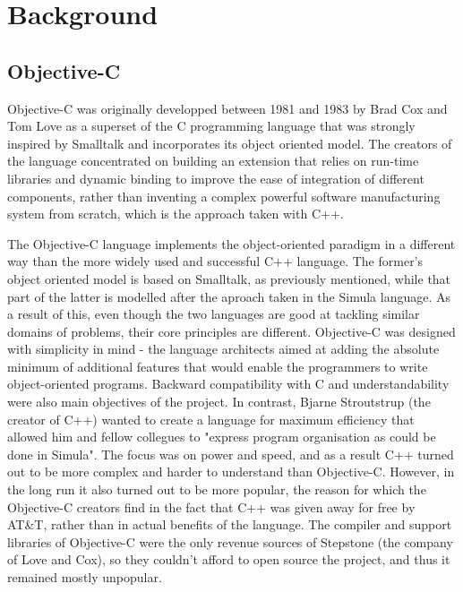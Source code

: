 \documentclass[parskip]{cs4rep}
\begin{document}
\chapter{Background}

\section{Objective-C}

Objective-C was originally developped between 1981 and 1983 by Brad Cox and Tom Love as a superset of the C programming language that was strongly inspired by Smalltalk and incorporates its object oriented model\cite{Biancuzzi2009}. The creators of the language concentrated on building an extension that relies on run-time libraries and dynamic binding to improve the ease of integration of different components, rather than inventing a complex powerful software manufacturing system from scratch, which is the approach taken with C++.

The Objective-C language implements the object-oriented paradigm in a different way than the more widely used and successful C++ language. The former's object oriented model is based on Smalltalk, as previously mentioned, while that part of the latter is modelled after the aproach taken in the Simula language. As a result of this, even though the two languages are good at tackling similar domains of problems, their core principles are different. Objective-C was designed with simplicity in mind - the language architects aimed at adding the absolute minimum of additional features that would enable the programmers to write object-oriented programs. Backward compatibility with C and understandability were also main objectives of the project. In contrast, Bjarne Stroutstrup (the creator of C++) wanted to create a language for maximum efficiency that allowed him and fellow collegues to "express program organisation as could be done in Simula"\cite{Biancuzzi2009}. The focus was on power and speed, and as a result C++ turned out to be more complex and harder to understand than Objective-C. However, in the long run it also turned out to be more popular, the reason for which the Objective-C creators find in the fact that C++ was given away for free by AT\&T, rather than in actual benefits of the language. The compiler and support libraries of Objective-C were the only revenue sources of Stepstone (the company of Love and Cox), so they couldn't afford to open source the project, and thus it remained mostly unpopular.
\end{document}
